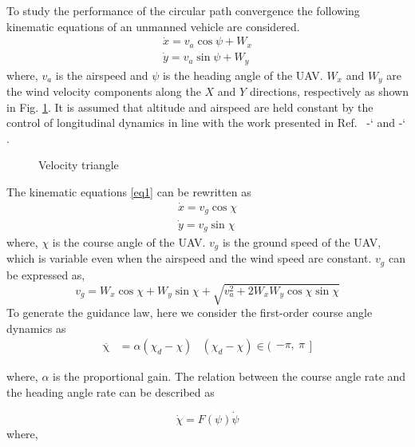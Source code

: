 \documentclass[Afour,sagev,times]{sagej}
\newcommand*{\citen}[1]{%
  \begingroup
    \romannumeral-`\x %
    \setcitestyle{numbers}%
    \cite{#1}%
  \endgroup   
}
\begin{document}
To study the performance of the circular path convergence the following kinematic equations of an unmanned vehicle are considered.
\begin{equation}\label{eq1}
\begin{split}
\dot{x}  = v_{a}\cos \psi +W_x\\
\dot{y}  = v_{a}\sin \psi+W_y
\end{split}
\end{equation} 
where, $v_a$ is the airspeed and  $\psi$ is the heading angle of the UAV.  $W_x$ and $W_y$ are the wind velocity components along the $X$ and $Y$ directions, respectively as shown in Fig. \ref{fig:geometryt}. It is assumed that altitude and airspeed are held constant by the control of longitudinal dynamics in line with the work presented in Ref.~\citen{nelson2007vector, liang2015combined} and \citen{frew2008coordinated}.


\begin{figure}[h]
\centering
\caption{Velocity triangle}
\label{fig:geometryt}
\end{figure}

The kinematic equations \eqref{eq1} can be rewritten as \begin{equation}\label{eq1222}
\begin{split}
\dot{x}  = v_{g}\cos \chi \\
\dot{y}  = v_{g}\sin \chi
\end{split}
\end{equation}
where, $\chi$ is the course angle of the UAV. $v_g$  is the ground speed of the UAV, which is variable  even when the airspeed and the wind speed are constant. $v_g$ can be expressed as,
\begin{equation}\label{referec}
v_g=W_x\cos\chi+W_y\sin\chi+\sqrt{v_a^2+2W_xW_y\cos{\chi}\sin\chi}
\end{equation}
 To generate the guidance law, here we consider the first-order course angle dynamics as
\begin{align}
\mathop \chi \limits^.  &= \alpha ({\chi _d} - \chi ) &   ({\chi _d} - \chi) \in (\begin{matrix}
-\pi,~\pi
\end{matrix}] \label{eq:law}
\end{align}

where, $\alpha $ is the proportional gain. The relation between the course angle rate and the heading angle rate can be described as \cite{frew2008coordinated}

\begin{equation}\label{ratereln}
\dot{\chi} =F(\psi )\dot{\psi} 
\end{equation}
where, 
\end{document}
